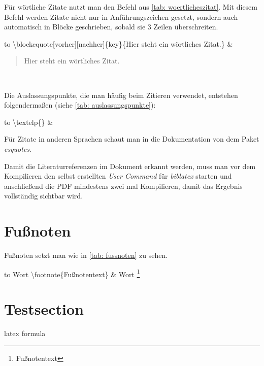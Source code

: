Für wörtliche Zitate nutzt man den Befehl aus \ref{tab: woertlicheszitat}. Mit diesem Befehl werden Zitate nicht nur in Anführungszeichen gesetzt, sondern auch automatisch in Blöcke geschrieben, sobald sie 3 Zeilen überschreiten.
\begin{table}[h]%
\begin{tabu} to \textwidth {X[c]X[c]}%
\toprule%
\textbackslash blockcquote[vorher][nachher]\{key\}\{Hier steht ein wörtliches Zitat.\} & \blockcquote[vorher][nachher]{einstein}{Hier steht ein wörtliches Zitat.}\\%
\bottomrule%
\end{tabu}%
\caption{Wörtliches Zitat}%
\label{tab: woertlicheszitat}%
\end{table}%

Die Auslassungspunkte, die man häufig beim Zitieren verwendet, entstehen folgendermaßen (siehe \ref{tab: auslassungspunkte}):
\begin{table}[h]%
\begin{tabu} to \textwidth {X[c]X[c]}%
\toprule%
\textbackslash textelp\{\} & \textelp{} \\%
\bottomrule%
\end{tabu}%
\caption{Auslassungspunkte}%
\label{tab: auslassungspunkte}%
\end{table}%


Für Zitate in anderen Sprachen schaut man in die Dokumentation von dem Paket \emph{csquotes}.%

Damit die Literaturreferenzen im Dokument erkannt werden, muss man vor dem Kompilieren den selbst erstellten \emph{User Command} für \emph{biblatex} starten und anschließend die PDF mindestens zwei mal Kompilieren, damit das Ergebnis vollständig sichtbar wird.%
%
%
\section{Fußnoten}%
Fußnoten setzt man wie in \ref{tab: fussnoten} zu sehen.\\%
\begin{table}[h]%
\begin{tabu} to \textwidth {X[c]X[c]}%
\toprule%
Wort \textbackslash footnote\{Fußnotentext\} & Wort \footnote{Fußnotentext} \\%
\bottomrule%
\end{tabu}%
\caption{Fußnoten}%
\label{tab: fussnoten}%
\end{table}%
%
%
\section{Testsection}

\gls{latex}
\Gls{formula}


\newpage
